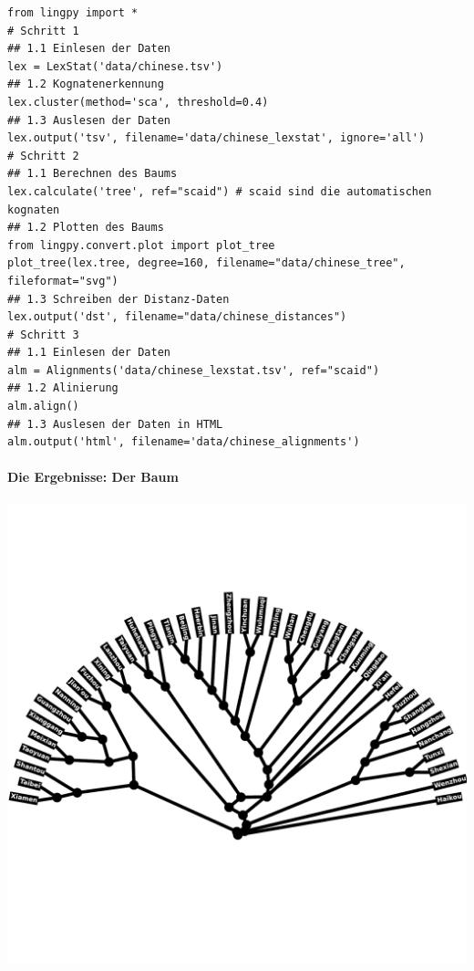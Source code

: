 \begin{verbatim}
from lingpy import *
# Schritt 1
## 1.1 Einlesen der Daten
lex = LexStat('data/chinese.tsv')
## 1.2 Kognatenerkennung
lex.cluster(method='sca', threshold=0.4)
## 1.3 Auslesen der Daten
lex.output('tsv', filename='data/chinese_lexstat', ignore='all')
# Schritt 2
## 1.1 Berechnen des Baums
lex.calculate('tree', ref="scaid") # scaid sind die automatischen kognaten
## 1.2 Plotten des Baums
from lingpy.convert.plot import plot_tree
plot_tree(lex.tree, degree=160, filename="data/chinese_tree", fileformat="svg")
## 1.3 Schreiben der Distanz-Daten
lex.output('dst', filename="data/chinese_distances")
# Schritt 3
## 1.1 Einlesen der Daten
alm = Alignments('data/chinese_lexstat.tsv', ref="scaid")
## 1.2 Alinierung
alm.align()
## 1.3 Auslesen der Daten in HTML
alm.output('html', filename='data/chinese_alignments')
\end{verbatim}





\paragraph{Die Ergebnisse: Der Baum}

\begin{center}
\includegraphics[width=\textwidth]{img/chinese_tree.pdf}
\end{center}




